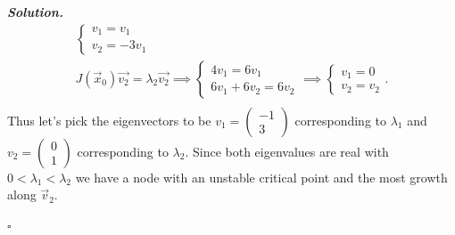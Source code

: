 \documentclass[12pt]{report}
\newenvironment{solution}[1][\it{Solution}]{\textbf{#1. } }{$\square$}
\begin{document}
\begin{solution}
\begin{align*}
\begin{cases}
            v_1 = v_1\\
            v_2 = -3v_1
        \end{cases}\\
        J(\vec{x}_0)\vec{v_2} = \lambda_2 \vec{v_2} \implies \begin{cases}
            4v_1 = 6v_1\\
            6v_1 + 6v_2 = 6v_2
        \end{cases} \implies
        \begin{cases}
            v_1 = 0\\
            v_2 = v_2
        \end{cases}.\\
    \end{align*}
    Thus let's pick the eigenvectors to be $v_1 = \begin{pmatrix}
        -1\\3
    \end{pmatrix}$ corresponding to $\lambda_1$ and $v_2 = \begin{pmatrix}
        0\\1
    \end{pmatrix}$ corresponding to $\lambda_2$. Since both eigenvalues are real with $0<\lambda_1 < \lambda_2$ we have a node with an unstable critical point and the most growth along $\vec{v}_2$. 




\end{solution}
\end{document}
